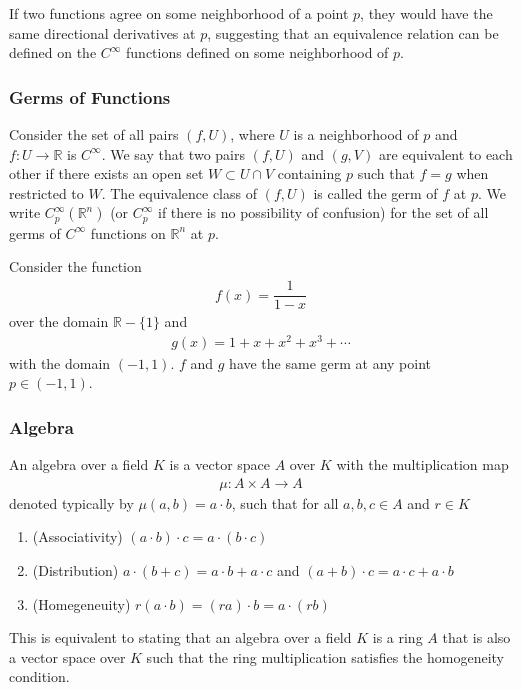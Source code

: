\documentclass{article}
\newcommand{\R}{\mathbb{R}}
\newcommand{\Cinfty}{C^{\infty}}
\begin{document}
	If two functions agree on some neighborhood of a point $p$, they would have the same directional derivatives at $p$, suggesting that an equivalence relation can be defined on the $\Cinfty$ functions defined on some neighborhood of $p$.
	
	\subsubsection*{Germs of Functions}
	Consider the set of all pairs $(f, U)$, where $U$ is a neighborhood of $p$ and $f: U \to \R$ is $\Cinfty$. We say that two pairs $(f, U)$ and $(g, V)$ are equivalent to each other if there exists an open set $W \subset U \cap V$ containing $p$ such that $f = g$ when restricted to $W$. The equivalence class of $(f, U)$ is called the germ of $f$ at $p$. We write $\Cinfty_p(\R^n)$ (or $\Cinfty_p$ if there is no possibility of confusion) for the set of all germs of $\Cinfty$ functions on $\R^n$ at $p$.
	
	Consider the function
	\begin{gather*}
		f(x) = \dfrac{1}{1 - x}
	\end{gather*}
	over the domain $\R - \{ 1 \}$ and
	\begin{gather*}
		g(x) = 1 + x + x^2 + x^3 + \cdots
	\end{gather*}
	with the domain $(-1, 1)$. $f$ and $g$ have the same germ at any point $p \in (-1, 1)$.
	
	\subsubsection*{Algebra}
	An algebra over a field $K$ is a vector space $A$ over $K$ with the multiplication map
	\begin{gather*}
		\mu: A \times A \to A
	\end{gather*}
	denoted typically by $\mu(a, b) = a \cdot b$, such that for all $a, b, c \in A$ and $r \in K$
	\begin{enumerate}
		\item (Associativity) $(a \cdot b) \cdot c = a \cdot (b \cdot c)$
		\item (Distribution) $a \cdot (b + c) = a \cdot b + a \cdot c$ and $(a + b) \cdot c = a \cdot c + a \cdot b$
		\item (Homegeneuity) $r(a \cdot b) = (ra) \cdot b = a \cdot (rb)$
	\end{enumerate}
	This is equivalent to stating that an algebra over a field $K$ is a ring $A$ that is also a vector space over $K$ such that the ring multiplication satisfies the homogeneity condition. 
\end{document}
